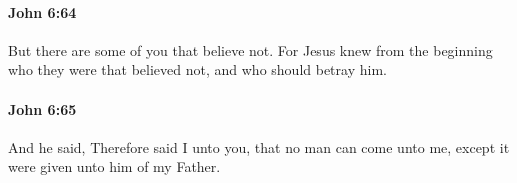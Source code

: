 		\paragraph{John 6:64} %
			\label{JOHN-6-64}

			But there are some of you that believe not. For Jesus knew from the beginning who they were that believed not, and who should betray him.

			\begin{framed}
			\scriptsize
				\begin{compactdesc}
					\item[SBLG] 
				\end{compactdesc}
			\end{framed}

		\paragraph{John 6:65} %
			\label{JOHN-6-65}

			And he said, Therefore said I unto you, that no man can come unto me, except it were given unto him of my Father.

